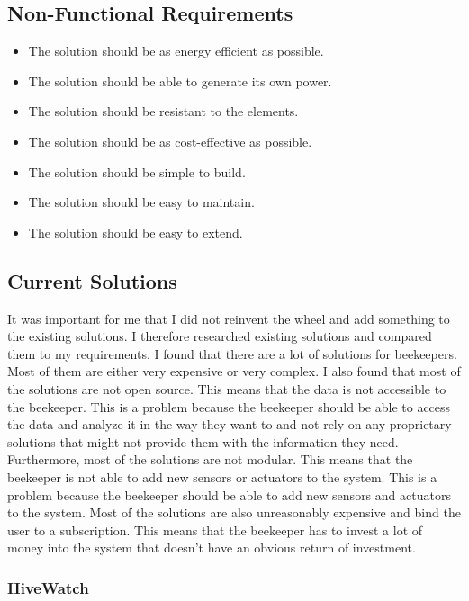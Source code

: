 \subsection{Non-Functional Requirements}
\begin{itemize}
    \item The solution should be as energy efficient as possible.
    \item The solution should be able to generate its own power.
    \item The solution should be resistant to the elements.
    \item The solution should be as cost-effective as possible.
    \item The solution should be simple to build.
    \item The solution should be easy to maintain.
    \item The solution should be easy to extend.
\end{itemize}

\newpage
\subsection{Current Solutions}
It was important for me that I did not reinvent the wheel and add something to the existing solutions. I therefore researched existing solutions and compared them to my requirements. I found that there are a lot of solutions for beekeepers. Most of them are either very expensive or very complex. I also found that most of the solutions are not open source. This means that the data is not accessible to the beekeeper. This is a problem because the beekeeper should be able to access the data and analyze it in the way they want to and not rely on any proprietary solutions that might not provide them with the information they need. Furthermore, most of the solutions are not modular. This means that the beekeeper is not able to add new sensors or actuators to the system. This is a problem because the beekeeper should be able to add new sensors and actuators to the system. Most of the solutions are also unreasonably expensive and bind the user to a subscription. This means that the beekeeper has to invest a lot of money into the system that doesn't have an obvious return of investment.

\newpage
\subsubsection{HiveWatch}

